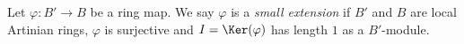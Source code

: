 \begin{definition}
\label{definition-small-extension}
Let $\varphi : B' \to B$ be a ring map.
We say $\varphi$ is a {\it small extension} if
$B'$ and $B$ are local Artinian rings, $\varphi$ is surjective
and $I = \Ker(\varphi)$ has length $1$ as a $B'$-module.
\end{definition}